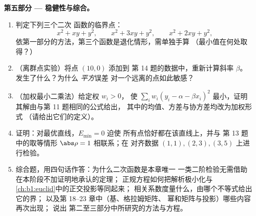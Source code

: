 \begin{problem}
\medskip
\noindent\textbf{第五部分 --- 稳健性与综合。}
\begin{enumerate}[resume]
  \item 判定下列三个二次
        函数的临界点：
        \[
        x^2 + xy + y^2, \qquad x^2 + 3xy + y^2, \qquad
        x^2 + 2xy + y^2 ,
        \]
        依第一部分的方法，第三个函数是退化情形，需单独手算
        （最小值在何处取得？）
  \item （离群点实验）将点 $(10, 0)$ 添加到
        第 14 题的数据中，重新计算斜率 $\beta$。
        发生了什么？为什么 \emph{平方}误差
        对一个远离的点如此敏感？
  \item （加权最小二乘法）给定权 $w_i > 0$，
        使 $\sum_i w_i(y_i - \alpha - \beta x_i)^2$ 最小，证明
        其解由与第 11 题相同的公式给出，
        其中的均值、方差与协方差均改为加权形式
        （请给出它们的定义）。
  \item 证明：对最优直线，$E_{\min} = 0$ 迫使
        所有点恰好都在该直线上，并与
        第 13 题中的取等情形 $\abs\rho = 1$ 相联系；在
        对齐数据 $(1,1), (2,3), (3,5)$ 上进行检验。
  \item 综合题，用四句话作答：为什么二次函数是本章唯一
        一类二阶检验无需借助在本阶段不加证明地承认的定理；
        正规方程如何把解析极小化与
        \cref{ch:b1:euclid}中的正交投影等同起来；
        相关系数度量什么，由哪个不等式给出它的界；
        以及第 18--23 章中（基、格拉姆矩阵、
        幂和矩阵与投影）哪些内容再次出现；
        说出
        第二至三部分中所研究的方法与方程。
\end{enumerate}
\end{problem}
